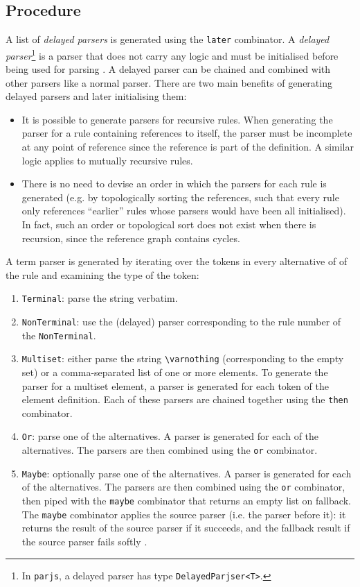 \subsection{Procedure}
\label{term:procedure}
A list of \textit{delayed parsers} is generated using the \lstinline{later} combinator. A \textit{delayed parser}\footnote{In \lstinline{parjs}, a delayed parser has type \lstinline{DelayedParjser<T>}.} is a parser that does not carry any logic and must be initialised before being used for parsing \cite{parjs}. A delayed parser can be chained and combined with other parsers like a normal parser. There are two main benefits of generating delayed parsers and later initialising them:
\begin{itemize}
    \item It is possible to generate parsers for recursive rules. When generating the parser for a rule containing references to itself, the parser must be incomplete at any point of reference since the reference is part of the definition. A similar logic applies to mutually recursive rules.
    \item There is no need to devise an order in which the parsers for each rule is generated (e.g. by topologically sorting the references, such that every rule only references ``earlier'' rules whose parsers would have been all initialised). In fact, such an order or topological sort does not exist when there is recursion, since the reference graph contains cycles.
\end{itemize}
A term parser is generated by iterating over the tokens in every alternative of of the rule and examining the type of the token:
\begin{enumerate}
    \item \lstinline{Terminal}: parse the string verbatim.
    \item \lstinline{NonTerminal}: use the (delayed) parser corresponding to the rule number of the \lstinline{NonTerminal}.
    \item \lstinline{Multiset}: either parse the string \lstinline{\varnothing} (corresponding to the empty set) or a comma-separated list of one or more elements. To generate the parser for a multiset element, a parser is generated for each token of the element definition. Each of these parsers are chained together using the \lstinline{then} combinator.
    \item \lstinline{Or}: parse one of the alternatives. A parser is generated for each of the alternatives. The parsers are then combined using the \lstinline{or} combinator.
    \item \lstinline{Maybe}: optionally parse one of the alternatives. A parser is generated for each of the alternatives. The parsers are then combined using the \lstinline{or} combinator, then piped with the \lstinline{maybe} combinator that returns an empty list on fallback. The \lstinline{maybe} combinator applies the source parser (i.e. the parser before it): it returns the result of the source parser if it succeeds, and the fallback result if the source parser fails softly \cite{parjs:maybe}.
\end{enumerate}